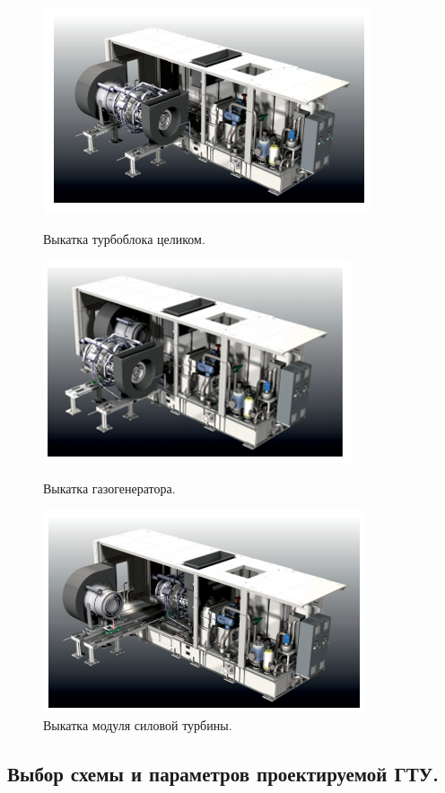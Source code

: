 \documentclass[a4paper,12pt]{article}
\begin{document}
    \begin{figure}[h!]
        \centering
        \includegraphics[scale=1.0]{./pictures/T16_tb_roll-out.png}
        \caption{Выкатка турбоблока целиком.}
        \label{pic_t16_tb_roll_out}
        \includegraphics[scale=1.0]{./pictures/T16_gg_roll-out.png}
        \caption{Выкатка газогенератора.}
        \label{pic_t16_gg_roll_out}
        \includegraphics[scale=1.0]{./pictures/T16_pt_rool-out.png}
        \caption{Выкатка модуля силовой турбины.}
        \label{pic_t16_pt_roll_out}
    \end{figure}


    \subsection{Выбор схемы и параметров проектируемой ГТУ.}
\end{document}
